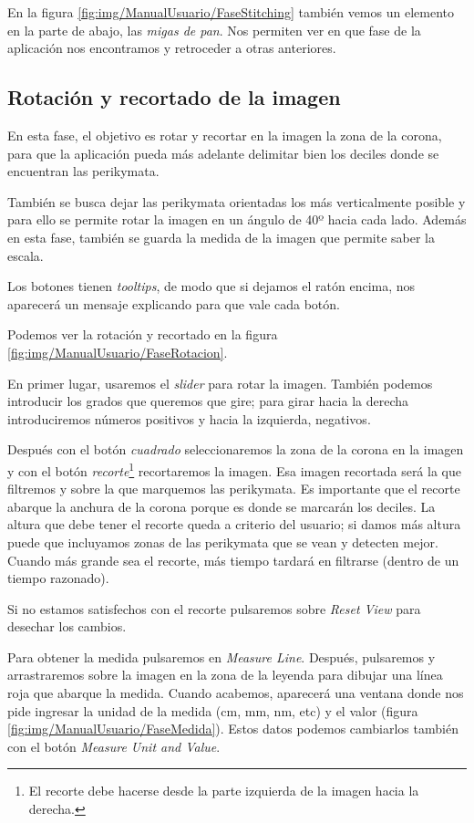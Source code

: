 En la figura \ref{fig:img/ManualUsuario/FaseStitching} también vemos un elemento en la parte de abajo, las \textit{migas de pan}. Nos permiten ver en que fase de la aplicación nos encontramos y retroceder a otras anteriores.


\subsection{Rotación y recortado de la imagen}
En esta fase, el objetivo es rotar y recortar en la imagen la zona de la corona, para que la aplicación pueda más adelante delimitar bien los deciles donde se encuentran las perikymata. 

También se busca dejar las perikymata orientadas los más verticalmente posible y para ello se permite rotar la imagen en un ángulo de 40º hacia cada lado. Además en esta fase, también se guarda la medida de la imagen que permite saber la escala.

Los botones tienen \textit{tooltips}, de modo que si dejamos el ratón encima, nos aparecerá un mensaje explicando para que vale cada botón.

Podemos ver la rotación y recortado en la figura \ref{fig:img/ManualUsuario/FaseRotacion}.

En primer lugar, usaremos el \textit{slider} para rotar la imagen. También podemos introducir los grados que queremos que gire; para girar hacia la derecha introduciremos números positivos y hacia la izquierda, negativos.

Después con el botón \textit{cuadrado} seleccionaremos la zona de la corona en la imagen y con el botón \textit{recorte}\footnote{El recorte debe hacerse desde la parte izquierda de la imagen hacia la derecha.} recortaremos la imagen. Esa imagen recortada será la que filtremos y sobre la que marquemos las perikymata. Es importante que el recorte abarque la anchura de la corona porque es donde se marcarán los deciles. La altura que debe tener el recorte queda a criterio del usuario; si damos más altura puede que incluyamos zonas de las perikymata que se vean y detecten mejor. Cuando más grande sea el recorte, más tiempo tardará en filtrarse (dentro de un tiempo razonado).

Si no estamos satisfechos con el recorte pulsaremos sobre \textit{Reset View} para desechar los cambios.
 
Para obtener la medida pulsaremos en \textit{Measure Line}. Después, pulsaremos y arrastraremos sobre la imagen en la zona de la leyenda para dibujar una línea roja que abarque la medida. Cuando acabemos, aparecerá una ventana donde nos pide ingresar la unidad de la medida (cm, mm, nm, etc) y el valor (figura \ref{fig:img/ManualUsuario/FaseMedida}). Estos datos podemos cambiarlos también con el botón \textit{Measure Unit and Value}.

